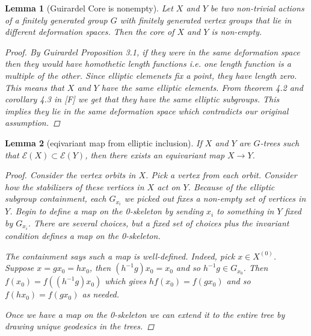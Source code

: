 \documentclass{article}
\theoremstyle{mystyle}
\newtheorem{lem}{Lemma}[section]
\theoremstyle{remark}
\begin{document}
\begin{lem}
    [Guirardel Core is nonempty]
    \label{lem:corenonempty} 
    Let \(X\) and \(Y\) be two non-trivial actions of a finitely generated group \(G\) with finitely generated vertex groups that lie in different deformation spaces. Then the core of \(X\) and \(Y\) is non-empty.
    \begin{proof}
        By Guirardel Proposition 3.1, if they were in the same deformation space then they would have homothetic length functions i.e. one length function is a multiple of the other. Since elliptic elemenets fix a point, they have length zero. This means that \(X\) and \(Y\) have the same elliptic elements. From theorem 4.2 and corollary 4.3 in [F] we get that they have the same elliptic subgroups. This implies they lie in the same deformation space which contradicts our original assumption.
    \end{proof}
\end{lem}




\begin{lem}[eqivariant map from elliptic inclusion]
    If $X$ and $Y$ are \(G\)-trees such that $\mathcal{E}(X)\subset\mathcal{E}(Y)$, then there exists an equivariant map $X\to Y$.
 
 \begin{proof}
 Consider the vertex orbits in $X$. Pick a vertex from each orbit. Consider how the stabilizers of these vertices in $X$ act on $Y$. Because of the elliptic subgroup containment, each $G_{x_i}$ we picked out fixes a non-empty set of vertices in $Y$. Begin to define a map on the 0-skeleton by sending $x_i$ to something in $Y$ fixed by $G_{x_i}$. There are several choices, but a fixed set of choices plus the invariant condition defines a map on the 0-skeleton.
 
The containment says such a map is well-defined. Indeed, pick $x \in X^{(0)}$. Suppose $x=gx_0=hx_0$, then $(h^{-1}g)x_0 = x_0$ and so $h^{-1}g \in G_{x_0}$. Then $f(x_0)=f( (h^{-1}g)x_0)$ which gives $h f(x_0) = f(gx_0)$ and so $f(hx_0)=f(gx_0)$ as needed.
 
 Once we have a map on the 0-skeleton we can extend it to the entire tree by drawing unique geodesics in the trees.
\end{proof}
\end{lem}
\end{document}
